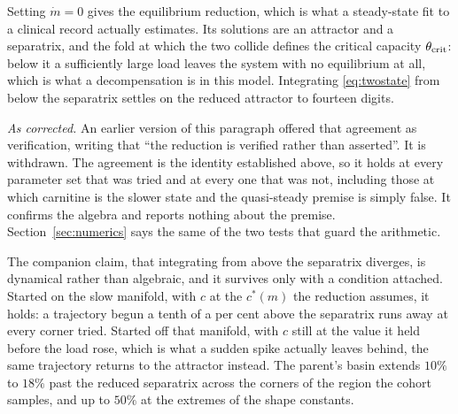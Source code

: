 Setting $\dot m = 0$ gives the equilibrium reduction, which is what a steady-state fit to a
clinical record actually estimates. Its solutions are an attractor and a separatrix, and the
fold at which the two collide defines the critical capacity $\theta_{\mathrm{crit}}$: below it a sufficiently
large load leaves the system with no equilibrium at all, which is what a decompensation is
in this model. Integrating \eqref{eq:twostate} from below the separatrix settles on the
reduced attractor to fourteen digits.

\emph{As corrected.} An earlier version of this paragraph offered that agreement as
verification, writing that ``the reduction is verified rather than asserted''. It is
withdrawn. The agreement is the identity established above, so it holds at every parameter
set that was tried and at every one that was not, including those at which carnitine is the
slower state and the quasi-steady premise is simply false. It confirms the algebra and
reports nothing about the premise. Section~\ref{sec:numerics} says the same of the two tests
that guard the arithmetic.

The companion claim, that integrating from above the separatrix diverges, is dynamical
rather than algebraic, and it survives only with a condition attached. Started on the slow
manifold, with $c$ at the $c^{\ast}(m)$ the reduction assumes, it holds: a trajectory begun a
tenth of a per cent above the separatrix runs away at every corner tried. Started off that
manifold, with $c$ still at the value it held before the load rose, which is what a sudden
spike actually leaves behind, the same trajectory returns to the attractor instead. The
parent's basin extends $10\%$ to $18\%$ past the reduced separatrix across the corners of
the region the cohort samples, and up to $50\%$ at the extremes of the shape constants.


